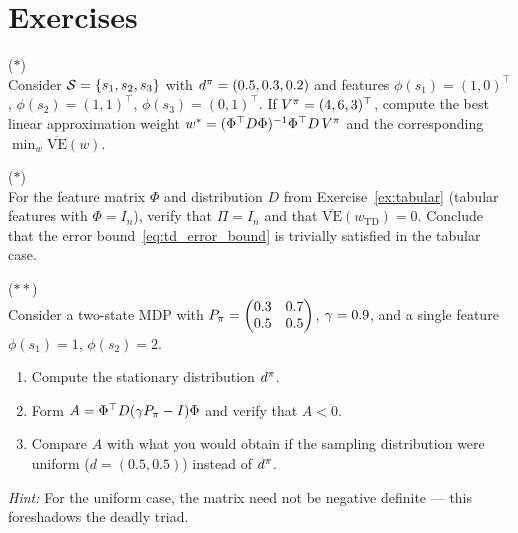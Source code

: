\documentclass[11pt,a4paper]{article}
\begin{document}
\section{Exercises}
\label{sec:exercises}

\begin{exercise}
\textnormal{(\(*\))} \\
Consider $\mathcal{S} = \{s_1, s_2, s_3\}$ with $d^\pi = (0.5, 0.3,
0.2)$ and features $\phi(s_1) = (1,0)^\top$, $\phi(s_2) = (1,1)^\top$,
$\phi(s_3) = (0,1)^\top$. If $V^\pi = (4, 6, 3)^\top$, compute
the best linear approximation weight $w^* = (\Phi^\top D\Phi)^{-1}
\Phi^\top D\, V^\pi$ and the corresponding $\min_w
\overline{\mathrm{VE}}(w)$.
\end{exercise}

\begin{exercise}
\textnormal{(\(*\))} \\
For the feature matrix $\Phi$ and distribution $D$ from
Exercise~\ref{ex:tabular} (tabular features with $\Phi = I_n$),
verify that $\Pi = I_n$ and that $\overline{\mathrm{VE}}(w_{\mathrm{TD}})
= 0$. Conclude that the error bound~\eqref{eq:td_error_bound} is
trivially satisfied in the tabular case.
\end{exercise}

\begin{exercise}
\textnormal{(\(**\))} \\
Consider a two-state MDP with $P_\pi = \begin{pmatrix} 0.3 & 0.7
\\ 0.5 & 0.5 \end{pmatrix}$, $\gamma = 0.9$, and a single feature
$\phi(s_1) = 1$, $\phi(s_2) = 2$.
\begin{enumerate}[nosep]
  \item[(a)] Compute the stationary distribution $d^\pi$.
  \item[(b)] Form $A = \Phi^\top D(\gamma P_\pi - I)\Phi$ and
    verify that $A < 0$.
  \item[(c)] Compare $A$ with what you would obtain if the sampling
    distribution were uniform ($d = (0.5, 0.5)$) instead of
    $d^\pi$.
\end{enumerate}
\textit{Hint:} For the uniform case, the matrix need not be negative
definite --- this foreshadows the deadly triad.
\end{exercise}
\end{document}
